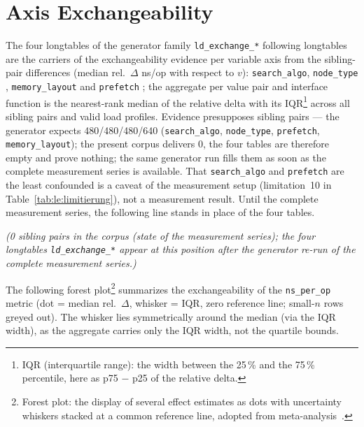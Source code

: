 \section{Axis Exchangeability}\label{sec:measurements:exchange}

The four \ifPlatzhalterAlsTabelle{}longtables of the generator family \texttt{ld\_exchange\_*}\else
following longtables\fi{} are the carriers of the exchangeability evidence per variable axis from
the sibling-pair differences (median rel.\ $\Delta$ ns/op with respect to $v$):
\texttt{search\_algo}, \texttt{node\_type}%
, \texttt{memory\_layout}%
 and \texttt{prefetch}%
; the aggregate per value pair and interface function is
the nearest-rank median of the relative delta with its IQR\footnote{IQR (interquartile range): the
width between the 25\,\% and the 75\,\% percentile, here as p75 $-$ p25 of the relative delta.}
across all sibling pairs and valid load profiles. Evidence presupposes sibling pairs --- the
generator expects 480/480/480/640 (\texttt{search\_algo}, \texttt{node\_type}, \texttt{prefetch},
\texttt{memory\_layout}); the present corpus delivers 0, the four tables are therefore empty and
prove nothing; the same generator run fills them as soon as the complete measurement series is
available. That \texttt{search\_algo} and \texttt{prefetch} are the least confounded is a caveat of
the measurement setup (limitation~10 in Table~\ref{tab:le:limitierung}), not a measurement
result.\ifPlatzhalterAlsTabelle{}
Until the complete measurement series, the following line stands in place of the four tables.\fi

\ifPlatzhalterAlsTabelle%
\emph{(0 sibling pairs in the corpus (state of the measurement series); the four longtables
\texttt{ld\_exchange\_*} appear at this position after the generator re-run of the complete
measurement series.)}
\else




\fi

The following forest plot\footnote{Forest plot: the display of several effect estimates as dots
with uncertainty whiskers stacked at a common reference line, adopted from
meta-analysis~\cite{lewis2001forest}.} summarizes the exchangeability of the \texttt{ns\_per\_op}
metric (dot = median rel.\ $\Delta$, whisker = IQR, zero reference line; small-$n$ rows greyed
out). The whisker lies symmetrically around the median (via the IQR width), as the aggregate
carries only the IQR width, not the quartile bounds.

